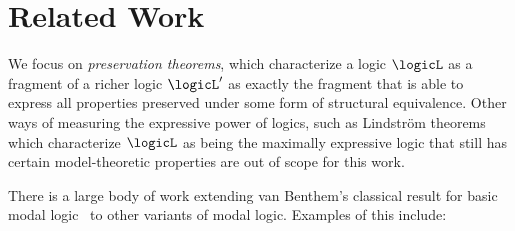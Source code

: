 \section{Related Work}\label{sec:related-work}
We focus on \emph{preservation theorems}, which characterize a logic $\logicL$ as a fragment of a richer logic $\logicL'$ as exactly the fragment that is able to express all properties preserved under some form of structural equivalence.
Other ways of measuring the expressive power of logics, such as Lindström theorems~\cite{lindstrom1969, benthem2009} which characterize $\logicL$ as being the maximally expressive logic that still has certain model-theoretic properties are out of scope for this work.

There is a large body of work extending van Benthem's classical result for basic modal logic~\cite{van1983modal} to other variants of modal logic.
Examples of this include:
